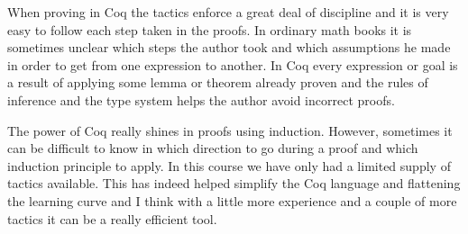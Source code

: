 \documentclass[9pt,a4paper,oneside]{article}
\begin{document}
When proving in Coq the tactics enforce a great deal of discipline and it is very easy to follow each step taken in the proofs. In ordinary math books it is sometimes unclear which steps the author took and which assumptions he made in order to get from one expression to another. In Coq every expression or goal is a result of applying some lemma or theorem already proven and the rules of inference and the type system helps the author avoid incorrect proofs.

The power of Coq really shines in proofs using induction. However, sometimes it can be difficult to know in which direction to go during a proof and which induction principle to apply. In this course we have only had a limited supply of tactics available. This has indeed helped simplify the Coq language and flattening the learning curve and I think with a little more experience and a couple of more tactics it can be a really efficient tool.
\end{document}
